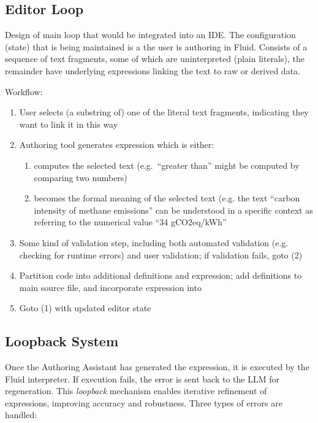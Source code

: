 \subsection{Editor Loop}
\label{subsec:editor-loop}
Design of main loop that would be integrated into an IDE. The configuration (state) that is being maintained
is a  the user is authoring in Fluid. Consists of a sequence of text fragments, some of which
are uninterpreted (plain literals), the remainder have underlying expressions linking the text to raw or derived
data.

Workflow:
\begin{enumerate}
\item User selects (a substring of) one of the literal text fragments, indicating they want to link it in this
way
\item Authoring tool generates expression which is either:
  \begin{enumerate}
  \item computes the selected text (e.g.~``greater than'' might be computed by comparing two numbers)
  \item becomes the formal meaning of the selected text (e.g. the text ``carbon intensity of methane
emissions'' can be understood in a specific context as referring to the numerical value ``34 gCO2eq/kWh''
  \end{enumerate}
\item Some kind of validation step, including both automated validation (e.g. checking for runtime errors) and
user validation; if validation fails, goto (2)
\item Partition code into additional definitions and expression; add definitions to main source file, and
incorporate expression into 
\item Goto (1) with updated editor state
\end{enumerate}

\subsection{Loopback System}
\label{subsec:loopback-system}

Once the Authoring Assistant has generated the expression, it is executed by the Fluid interpreter.
If execution fails, the error is sent back to the LLM for regeneration.
This \textit{loopback} mechanism enables iterative refinement of expressions, improving accuracy and robustness.
Three types of errors are handled:

